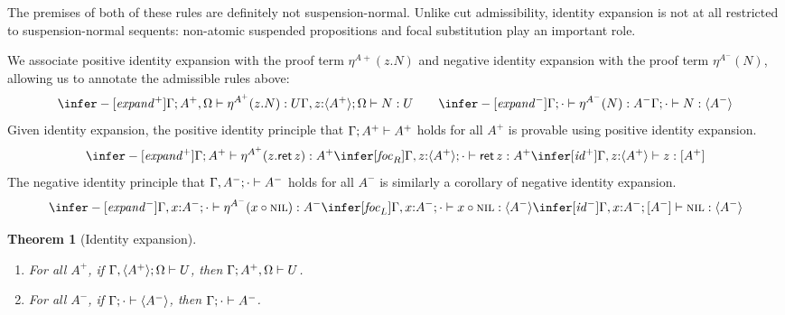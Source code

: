 \documentclass[acmtocl]{robtrans}\pdfoutput=1
\newtheorem{theorem}{Theorem}
\newcommand{\susp}[1]{\langle{#1}\rangle}
\newcommand{\ifoc}[3]{{#1}; {#2} \vdash {#3} \mathstrut}
\newcommand{\rfoct}[3]{{#1} \vdash {#2} : [{#3}] \mathstrut}
\newcommand{\lfoct}[4]{{#1}; [{#3}] \vdash {#2} : {#4} \mathstrut}
\newcommand{\ifoct}[4]{{#1}; {#2} \vdash {#3} : {#4} \mathstrut}
\newcommand{\rft}[1]{\mathsf{ret}\,{#1}} \newcommand{\lft}[2]{{#1} \circ {#2}}
\begin{document}
The premises of both of these rules are definitely not
suspension-normal. Unlike cut admissibility, identity expansion is not
at all restricted to suspension-normal sequents: non-atomic suspended
propositions and focal substitution play an important role. 

We associate positive identity expansion with the proof term $\eta^{A+}(z.N)$
and negative identity expansion with the proof term $\eta^{A^-}(N)$, 
allowing us to annotate the admissible rules above:
\[
\infer-[{\it expand}^+]
{\ifoct{\Gamma}{A^+, \Omega}{\eta^{A^+}(z.N)}{U}}
{\ifoct{\Gamma, z{:}\susp{A^+}}{\Omega}{N}{U}}
\qquad
\infer-[{\it expand}^-]
{\ifoct{\Gamma}{\cdot}{\eta^{A^-}(N)}{A^-}}
{\ifoct{\Gamma}{\cdot}{N}{\susp{A^-}}}
\]
Given identity expansion, the positive identity principle that
$\ifoc{\Gamma}{A^+}{A^+}$ holds for all $A^+$ is provable using
positive identity expansion.
\[
\infer-[{\it expand}^+]
{\ifoct{\Gamma}{A^+}{\eta^{A^+}(z.\rft{z})}{A^+}}
{\infer[{\it foc}_R]
 {\ifoct{\Gamma, z{:}\susp{A^+}}{\cdot}{\rft{z}}{A^+}}
 {\infer[{\it id}^+]
  {\rfoct{\Gamma, z{:}\susp{A^+}}{{z}}{A^+}}
  {}}}
\]
 The negative identity principle that $\ifoc{\Gamma, A^-}{\cdot}{A^-}$
 holds for all $A^-$ is similarly a corollary of negative identity
 expansion.
\[
\infer-[{\it expand}^-]
{\ifoct{\Gamma, x{:}A^-}{\cdot}{\eta^{A^-}(\lft{x}{\textsc{nil}})}{A^-}}
{\infer[{\it foc}_L]
 {\ifoct{\Gamma, x{:}A^-}{\cdot}{\lft{x}{\textsc{nil}}}{\susp{A^-}}}
 {\infer[{\it id}^-]
  {\lfoct{\Gamma, x{:}A^-}{\textsc{nil}}{A^-}{\susp{A^-}}}
  {}}}
\]

\begin{theorem}[Identity expansion]\label{thm:identity}~
\begin{enumerate}
\item For all $A^+$, if $\ifoc{\Gamma, \susp{A^+}}{\Omega}{U}$, 
then $\ifoc{\Gamma}{A^+, \Omega}{U}$. 
\item For all $A^-$, if $\ifoc{\Gamma}{\cdot}{\susp{A^-}}$,
then $\ifoc{\Gamma}{\cdot}{A^-}$. 
\end{enumerate}
\end{theorem}
\end{document}

